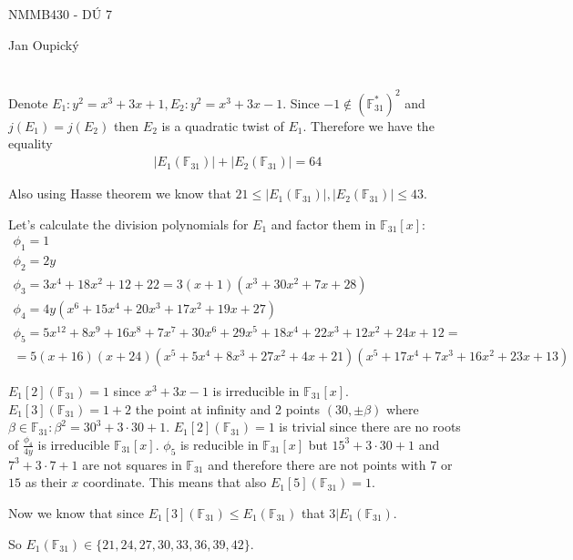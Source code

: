 \documentclass[12pt, a4paper]{article}
\begin{document}
\begin{center}
\large NMMB430 - DÚ 7

\normalsize Jan Oupický
\end{center}
\vspace{1\baselineskip}

\section{}
Denote $E_1: y^2=x^3+3x+1, E_2: y^2=x^3+3x-1$. Since $-1 \notin (\mathbb{F}_{31}^*)^2$ and $j(E_1)=j(E_2)$ then $E_2$ is a quadratic twist of $E_1$. Therefore we have the equality
\begin{gather*}
|E_1(\mathbb{F}_{31})|+|E_2(\mathbb{F}_{31})|=64
\end{gather*}

Also using Hasse theorem we know that $21 \leq |E_1(\mathbb{F}_{31})|,|E_2(\mathbb{F}_{31})| \leq 43$.

Let's calculate the division polynomials for $E_1$ and factor them in $\mathbb{F}_{31}[x]$:
\begin{gather*}
\phi_1= 1\\
\phi_2 = 2y\\
\phi_3 = 3x^4+18x^2+12+22 = 3(x+1)(x^3+30x^2+7x+28)\\
\phi_4 = 4y(x^6+15x^4+20x^3+17x^2+19x+27)\\
\phi_5 = 5x^{12}+8x^9+16x^8+7x^7+30x^6+29x^5+18x^4+22x^3+12x^2+24x+12 = \\
=5(x+16)(x+24)(x^5+5x^4+8x^3+27x^2+4x+21)(x^5+17x^4+7x^3+16x^2+23x+13)
\end{gather*}

$E_1[2](\mathbb{F}_{31})=1$ since $x^3+3x-1$ is irreducible in $\mathbb{F}_{31}[x]$. $E_1[3](\mathbb{F}_{31})=1+2$ the point at infinity and 2 points $(30,\pm \beta)$ where $\beta \in \mathbb{F}_{31}:\beta^2=30^3+3\cdot30+1$. $E_1[2](\mathbb{F}_{31})=1$ is trivial since there are no roots of $\frac{\phi_4}{4y}$ is irreducible $\mathbb{F}_{31}[x]$. $\phi_5$ is reducible in $\mathbb{F}_{31}[x]$ but $15^3+3\cdot30+1$ and $7^3+3\cdot7+1$ are not squares in $\mathbb{F}_{31}$ and therefore there are not points with $7$ or $15$ as their $x$ coordinate. This means that also $E_1[5](\mathbb{F}_{31})=1$.

Now we know that since $E_1[3](\mathbb{F}_{31}) \leq E_1(\mathbb{F}_{31})$ that $3|E_1(\mathbb{F}_{31})$. 

So $E_1(\mathbb{F}_{31}) \in \{21, 24, 27, 30, 33, 36, 39, 42\}$.
\end{document}
